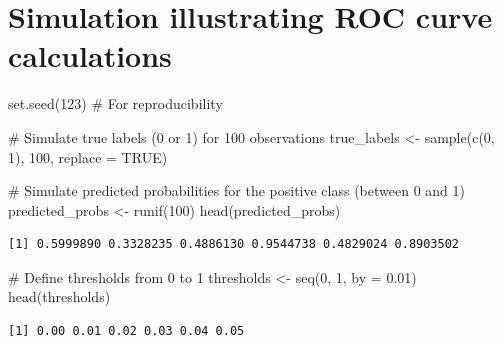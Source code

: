 \documentclass[
  letterpaper,
  DIV=11,
  numbers=noendperiod]{scrreprt}
\newenvironment{Shaded}{\begin{snugshade}}{\end{snugshade}}
\newcommand{\AttributeTok}[1]{\textcolor[rgb]{0.40,0.45,0.13}{#1}}
\newcommand{\CommentTok}[1]{\textcolor[rgb]{0.37,0.37,0.37}{#1}}
\newcommand{\ConstantTok}[1]{\textcolor[rgb]{0.56,0.35,0.01}{#1}}
\newcommand{\DecValTok}[1]{\textcolor[rgb]{0.68,0.00,0.00}{#1}}
\newcommand{\FloatTok}[1]{\textcolor[rgb]{0.68,0.00,0.00}{#1}}
\newcommand{\FunctionTok}[1]{\textcolor[rgb]{0.28,0.35,0.67}{#1}}
\newcommand{\NormalTok}[1]{\textcolor[rgb]{0.00,0.23,0.31}{#1}}
\newcommand{\OtherTok}[1]{\textcolor[rgb]{0.00,0.23,0.31}{#1}}
\begin{document}
\section{Simulation illustrating ROC curve
calculations}\label{simulation-illustrating-roc-curve-calculations}

\begin{Shaded}
\begin{Highlighting}[]
\FunctionTok{set.seed}\NormalTok{(}\DecValTok{123}\NormalTok{)  }\CommentTok{\# For reproducibility}

\CommentTok{\# Simulate true labels (0 or 1) for 100 observations}
\NormalTok{true\_labels }\OtherTok{\textless{}{-}} \FunctionTok{sample}\NormalTok{(}\FunctionTok{c}\NormalTok{(}\DecValTok{0}\NormalTok{, }\DecValTok{1}\NormalTok{), }\DecValTok{100}\NormalTok{, }\AttributeTok{replace =} \ConstantTok{TRUE}\NormalTok{)}

\CommentTok{\# Simulate predicted probabilities for the positive class (between 0 and 1)}
\NormalTok{predicted\_probs }\OtherTok{\textless{}{-}} \FunctionTok{runif}\NormalTok{(}\DecValTok{100}\NormalTok{)}
\FunctionTok{head}\NormalTok{(predicted\_probs)}
\end{Highlighting}
\end{Shaded}

\begin{verbatim}
[1] 0.5999890 0.3328235 0.4886130 0.9544738 0.4829024 0.8903502
\end{verbatim}

\begin{Shaded}
\begin{Highlighting}[]
\CommentTok{\# Define thresholds from 0 to 1}
\NormalTok{thresholds }\OtherTok{\textless{}{-}} \FunctionTok{seq}\NormalTok{(}\DecValTok{0}\NormalTok{, }\DecValTok{1}\NormalTok{, }\AttributeTok{by =} \FloatTok{0.01}\NormalTok{)}
\FunctionTok{head}\NormalTok{(thresholds)}
\end{Highlighting}
\end{Shaded}

\begin{verbatim}
[1] 0.00 0.01 0.02 0.03 0.04 0.05
\end{verbatim}
\end{document}
